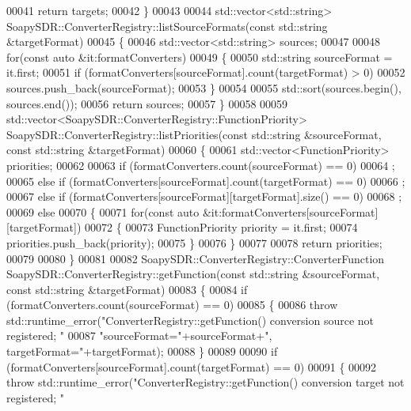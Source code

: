 \begin{DoxyCode}
{00041   \textcolor{keywordflow}{return} targets;
00042 \}
00043 
00044 std::vector<std::string> SoapySDR::ConverterRegistry::listSourceFormats(\textcolor{keyword}{const} 
      std::string &targetFormat)
00045 \{
00046   std::vector<std::string> sources;
00047 
00048   \textcolor{keywordflow}{for}(\textcolor{keyword}{const} \textcolor{keyword}{auto} &it:formatConverters)
00049     \{
00050       std::string sourceFormat = it.first;
00051       \textcolor{keywordflow}{if} (formatConverters[sourceFormat].count(targetFormat) > 0)
00052         sources.push\_back(sourceFormat);
00053     \}
00054   
00055   std::sort(sources.begin(), sources.end());
00056   \textcolor{keywordflow}{return} sources;
00057 \}
00058 
00059 std::vector<SoapySDR::ConverterRegistry::FunctionPriority> 
      SoapySDR::ConverterRegistry::listPriorities(\textcolor{keyword}{const} std::string &sourceFormat, \textcolor{keyword}{const} 
      std::string &targetFormat)
00060 \{
00061   std::vector<FunctionPriority> priorities;
00062   
00063   \textcolor{keywordflow}{if} (formatConverters.count(sourceFormat) == 0)
00064     ;
00065   \textcolor{keywordflow}{else} \textcolor{keywordflow}{if} (formatConverters[sourceFormat].count(targetFormat) == 0)
00066     ;
00067   \textcolor{keywordflow}{else} \textcolor{keywordflow}{if} (formatConverters[sourceFormat][targetFormat].size() == 0)
00068     ;
00069   \textcolor{keywordflow}{else}
00070     \{
00071       \textcolor{keywordflow}{for}(\textcolor{keyword}{const} \textcolor{keyword}{auto} &it:formatConverters[sourceFormat][targetFormat])
00072     \{
00073       FunctionPriority priority = it.first;
00074       priorities.push\_back(priority);
00075     \}
00076     \}
00077   
00078   \textcolor{keywordflow}{return} priorities;
00079   
00080 \}
00081 
00082 SoapySDR::ConverterRegistry::ConverterFunction 
      SoapySDR::ConverterRegistry::getFunction(\textcolor{keyword}{const} std::string &sourceFormat, \textcolor{keyword}{const} 
      std::string &targetFormat)
00083 \{
00084   \textcolor{keywordflow}{if} (formatConverters.count(sourceFormat) == 0)
00085     \{
00086       \textcolor{keywordflow}{throw} std::runtime\_error(\textcolor{stringliteral}{"ConverterRegistry::getFunction() conversion source not registered; "}
00087                    \textcolor{stringliteral}{"sourceFormat="}+sourceFormat+\textcolor{stringliteral}{", targetFormat="}+targetFormat);
00088     \}
00089   
00090   \textcolor{keywordflow}{if} (formatConverters[sourceFormat].count(targetFormat) == 0)
00091     \{
00092       \textcolor{keywordflow}{throw} std::runtime\_error(\textcolor{stringliteral}{"ConverterRegistry::getFunction() conversion target not registered; "}
}
\end{DoxyCode}

